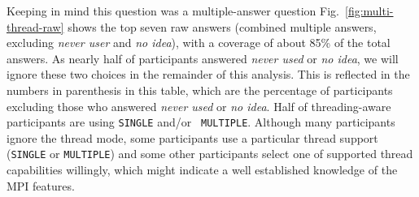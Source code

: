 \documentclass[preprint,5p,times]{elsarticle}
\def\myquote#1{{\it #1}}
\newcommand{\revision}[2]{{\color{blue}#2}}
\begin{document}
Keeping in mind this question was a
\revision{multiple-choice}{multiple-answer} question
\revision{Table~\ref{tab:multi-thread-raw}}{Fig.~\ref{fig:multi-thread-raw}}
shows the top \revision{7}{seven} raw answers
(combined multiple answers\revision{}{, excluding \myquote{never user} and
  \myquote{no idea}}),
with a coverage of about 85\% of the total answers.
As nearly half of participants answered \myquote{never used} or \myquote{no idea},
we will ignore these two choices in the remainder of this analysis. This is
reflected in the numbers in parenthesis in this table, which are the percentage
of participants excluding those who answered \myquote{never used} or \myquote{no
idea}. Half of threading-aware participants are using {\tt SINGLE} and/or {\tt
MULTIPLE}. Although many participants ignore the thread mode, some participants
use a particular thread support ({\tt SINGLE} or {\tt MULTIPLE}) and some other
participants select one of supported thread capabilities willingly, which might
indicate a well established knowledge of the MPI features.
\end{document}
